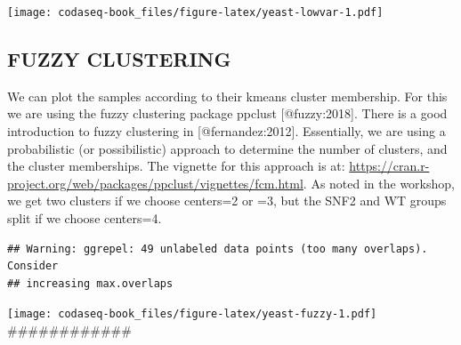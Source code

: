 \documentclass[
  onecolumn]{article}
\newenvironment{Shaded}{\begin{snugshade}}{\end{snugshade}}
\newcommand{\AttributeTok}[1]{\textcolor[rgb]{0.77,0.63,0.00}{#1}}
\newcommand{\CommentTok}[1]{\textcolor[rgb]{0.56,0.35,0.01}{\textit{#1}}}
\newcommand{\ConstantTok}[1]{\textcolor[rgb]{0.00,0.00,0.00}{#1}}
\newcommand{\DecValTok}[1]{\textcolor[rgb]{0.00,0.00,0.81}{#1}}
\newcommand{\FunctionTok}[1]{\textcolor[rgb]{0.00,0.00,0.00}{#1}}
\newcommand{\NormalTok}[1]{#1}
\newcommand{\OtherTok}[1]{\textcolor[rgb]{0.56,0.35,0.01}{#1}}
\newcommand{\SpecialCharTok}[1]{\textcolor[rgb]{0.00,0.00,0.00}{#1}}
\newcommand{\StringTok}[1]{\textcolor[rgb]{0.31,0.60,0.02}{#1}}
\begin{document}
\texttt{[image: codaseq-book\_files/figure-latex/yeast-lowvar-1.pdf]}
\clearpage

\hypertarget{fuzzy-clustering}{%
\subsection{FUZZY CLUSTERING}\label{fuzzy-clustering}}

We can plot the samples according to their kmeans cluster membership. For this we are using the fuzzy clustering package ppclust {[}@fuzzy:2018{]}. There is a good introduction to fuzzy clustering in {[}@fernandez:2012{]}. Essentially, we are using a probabilistic (or possibilistic) approach to determine the number of clusters, and the cluster memberships. The vignette for this approach is at: \url{https://cran.r-project.org/web/packages/ppclust/vignettes/fcm.html}. As noted in the workshop, we get two clusters if we choose centers=2 or =3, but the SNF2 and WT groups split if we choose centers=4.

\begin{Shaded}
\end{Shaded}

\begin{verbatim}
## Warning: ggrepel: 49 unlabeled data points (too many overlaps). Consider
## increasing max.overlaps
\end{verbatim}

\texttt{[image: codaseq-book\_files/figure-latex/yeast-fuzzy-1.pdf]}
\#\#\#\#\#\#\#\#\#\#\#\#
\end{document}
